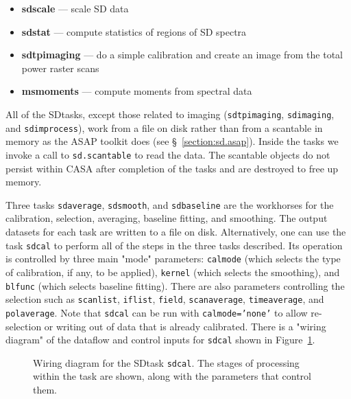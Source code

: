 \begin{itemize}
\item {\bf sdscale} --- scale SD data
 
\item {\bf sdstat} --- compute statistics of regions of SD spectra

\item {\bf sdtpimaging} --- do a simple calibration and create an image from the total power raster scans
 
\item{\bf msmoments} --- compute moments from spectral data

\end{itemize}

All of the SDtasks, except  those related to imaging  ({\tt sdtpimaging}, {\tt sdimaging}, and {\tt sdimprocess}), 
work from a file on disk rather than from
a scantable in memory as the ASAP toolkit does (see 
\S~\ref{section:sd.asap}).  Inside the tasks we invoke a call
to {\tt sd.scantable} to read the data.  The scantable objects
do not persist within CASA after completion of the tasks and
are destroyed to free up memory. 

Three tasks {\tt sdaverage}, {\tt sdsmooth}, and {\tt sdbaseline} are the
workhorses for the calibration, selection,
averaging, baseline fitting, and smoothing. The output datasets for
each task are written to a file on disk.
Alternatively, one can use the task {\tt sdcal} to perform all of the steps in
the three tasks described. 
Its operation is
controlled by three main "mode" parameters: {\tt calmode} (which selects
the type of calibration, if any, to be applied), {\tt kernel} (which selects
the smoothing), and {\tt blfunc} (which selects baseline fitting).  There
are also parameters controlling the selection such as {\tt scanlist}, 
{\tt iflist}, {\tt field}, {\tt scanaverage}, {\tt timeaverage}, and
{\tt polaverage}.  Note that {\tt sdcal} can be
run with {\tt calmode='none'} to allow re-selection or writing out of data
that is already calibrated.  There is a "wiring diagram" of the dataflow and control inputs for
{\tt sdcal} shown in Figure~\ref{fig:sdcal}.

\begin{figure}[h!]
\begin{center}
\caption{\label{fig:sdcal} Wiring diagram for the SDtask {\tt sdcal}.
The stages of processing within the task are shown, along with the
parameters that control them. }
\hrulefill
\end{center}
\end{figure}

